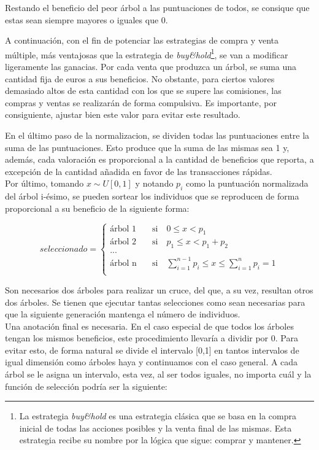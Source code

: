 Restando el beneficio del peor \'arbol a las puntuaciones de todos, se consique que estas sean siempre mayores o iguales que 0.

A continuaci\'on, con el fin de potenciar las estrategias de compra y venta m\'ultiple, m\'as ventajosas que la estrategia de \textit{buy\&hold}\footnote{La estrategia \textit{buy\&hold} es una estrategia cl\'asica que se basa en la compra inicial de todas las acciones posibles y la venta final de las mismas. Esta estrategia recibe su nombre por la l\'ogica que sigue: comprar y mantener.}, se van a modificar ligeramente las ganacias. Por cada venta que produzca un \'arbol, se suma una cantidad fija de euros a sus beneficios. No obstante, para ciertos valores demasiado altos de esta cantidad con los que se supere las comisiones, las compras y ventas se realizar\'an de forma compulsiva. Es importante, por consiguiente, ajustar bien este valor para evitar este resultado.

En el \'ultimo paso de la normalizacion, se dividen todas las puntuaciones entre la suma de las puntuaciones. Esto produce que la suma de las mismas sea 1 y, adem\'as, cada valoraci\'on es proporcional a la cantidad de beneficios que reporta, a excepci\'on de la cantidad a\~nadida en favor de las transacciones r\'apidas.\\

Por \'ultimo, tomando $x \sim U[0,1]$ y notando $p_i$ como la puntuaci\'on normalizada del \'arbol i-\'esimo, se pueden sortear los individuos que se reproducen de forma proporcional a su beneficio de la siguiente forma:

\[   
seleccionado = 
     \begin{cases}
       \text{\'arbol 1} &\quad\text{si}\quad 0 \leq x < p_1\\
       \text{\'arbol 2} &\quad\text{si}\quad p_1 \leq x < p_1 + p_2\\
       \text{...} \\
       \text{\'arbol n} &\quad\text{si}\quad \sum\limits_{i=1}^{n-1} p_i \leq x \leq \sum\limits_{i=1}^{n} p_i = 1\\ 
     \end{cases}
\]

Son necesarios dos \'arboles para realizar un cruce, del que, a su vez, resultan otros dos \'arboles. Se tienen que ejecutar tantas selecciones como sean necesarias para que la siguiente generaci\'on mantenga el n\'umero de individuos.\\

Una anotaci\'on final es necesaria. En el caso especial de que todos los \'arboles tengan los mismos beneficios, este procedimiento llevar\'ia a dividir por 0. Para evitar esto, de forma natural se divide el intervalo [0,1] en tantos intervalos de igual dimensi\'on como \'arboles haya y continuamos con el caso general. A cada \'arbol se le asigna un intervalo, esta vez, al ser todos iguales, no importa cu\'al y la funci\'on de selecci\'on podr\'ia ser la siguiente:

